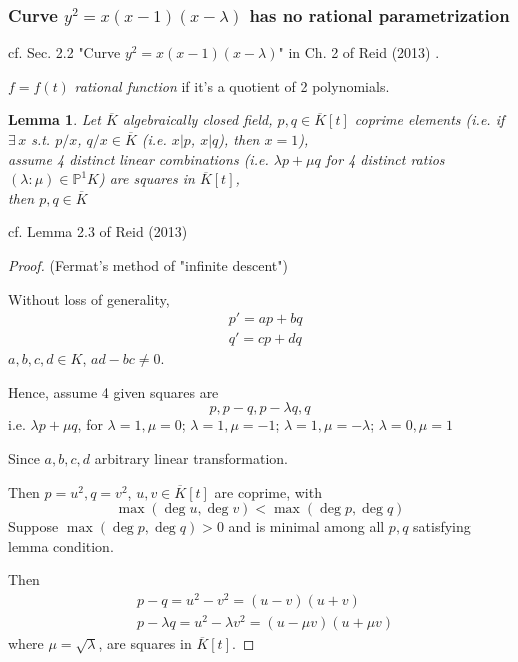 \documentclass[10pt]{amsart}
\newtheorem{lemma}{Lemma}
\begin{document}
\begin{multicols*}{2}
\subsubsection{Curve $y^2 = x(x-1)(x-\lambda )$ has no rational parametrization}

cf. Sec. 2.2 "Curve $y^2 = x(x-1)(x-\lambda)$" in Ch. 2 of Reid (2013) \cite{Reid2013}.

$f = f(t)$ \emph{rational function} if it's a quotient of 2 polynomials. 

\begin{lemma}\label{Lem:SquaresOfCoprimesAreConstant}
	Let $\overline{K}$ algebraically closed field, $p, q \in \overline{K}[t]$ coprime elements (i.e. if $\exists \, x $ s.t. $p/x$, $q/x \in \overline{K}$ (i.e. $x | p$, $x | q$), then $x=1$), \\
	assume 4 distinct linear combinations (i.e. $\lambda p + \mu q$ for 4 distinct ratios $(\lambda : \mu) \in \mathbb{P}^1K$) are squares in $\overline{K}[t]$, \\ 
	then $p,q \in \overline{K}$
\end{lemma}

cf. Lemma 2.3 of Reid (2013) \cite{Reid2013}

\begin{proof}
	(Fermat's method of "infinite descent")
	
	Without loss of generality, 
	\[
	\begin{aligned}
		& p' = ap + bq \\ 
		& q' = cp + dq
	\end{aligned}
	\]
	$a,b,c, d \in K$, $ad-bc \neq 0$. 
	
	Hence, assume 4 given squares are 
	\[
	p, p-q, p-\lambda q , q
	\]
	i.e. $\lambda p + \mu q$, for $\lambda = 1, \mu = 0$; $\lambda = 1, \mu = -1$; $\lambda = 1, \mu = -\lambda$; $\lambda = 0, \mu = 1$
	
	Since $a,b,c,d$ arbitrary linear transformation.
	
	Then $p = u^2, q = v^2$, $u,v \in \overline{K}[t]$ are coprime, with 
	\[
	\max{ (\deg{u} , \deg{v} )} < \max{ (\deg{p}, \deg{q})}
	\]
	Suppose $\max{(\deg{p}, \deg{q})} >0$ and is minimal among all $p,q$ satisfying lemma condition.
	
	Then 
	\[
	\begin{aligned}
	& p - q = u^2 - v^2 = (u-v)(u+v) \\
	& p - \lambda q = u^2 - \lambda v^2 = (u-\mu v) (u + \mu v)
	\end{aligned}
	\]
	where $\mu = \sqrt{\lambda}$, are squares in $\overline{K}[t]$. 
	

\end{proof}
\end{multicols*}
\end{document}
